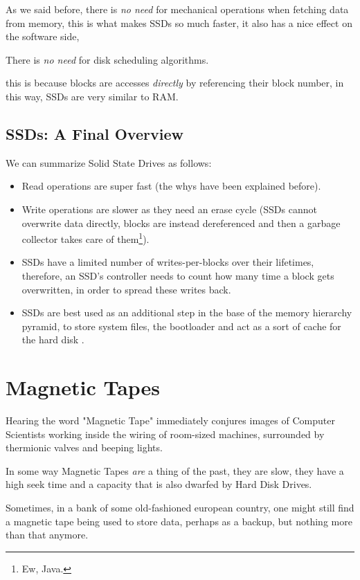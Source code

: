 \documentclass[openright, twoside]{report}
\theoremstyle{definition}
\theoremstyle{example}
\begin{document}
As we said before, there is \emph{no need} for mechanical operations when fetching data from 
memory, this is what makes SSDs so much faster, it also has a nice effect on the software side, 
\begin{center}
	There is \emph{no need} for disk scheduling algorithms.
\end{center}

this is because blocks are accesses \emph{directly} by referencing their block number, in this way, 
SSDs are very similar to RAM.

\subsection{SSDs: A Final Overview}
We can summarize Solid State Drives as follows:

\begin{itemize}
	\item Read operations are super fast (the whys have been explained before).
	\item Write operations are slower as they need an erase cycle (SSDs cannot overwrite data directly, blocks are 
	instead dereferenced and then a garbage collector takes care of them\footnote{Ew, Java.}).
	\item SSDs have a limited number of writes-per-blocks over their lifetimes, therefore, an SSD's controller 
	needs to count how many time a block gets overwritten, in order to spread these writes back.
	\item SSDs are best used as an additional step in the base of the memory hierarchy pyramid, to store 
	system files, the bootloader and act as a sort of cache for the hard disk .
\end{itemize}

\section{Magnetic Tapes}
Hearing the word "Magnetic Tape" immediately conjures images of Computer Scientists working 
inside the wiring of room-sized machines, surrounded by thermionic valves and beeping lights.

In some way Magnetic Tapes \emph{are} a thing of the past, they are slow, they have a high seek time 
and a capacity that is also dwarfed by Hard Disk Drives.

Sometimes, in a bank of some old-fashioned european country, one might still find a magnetic tape 
being used to store data, perhaps as a backup, but nothing more than that anymore.
\end{document}
